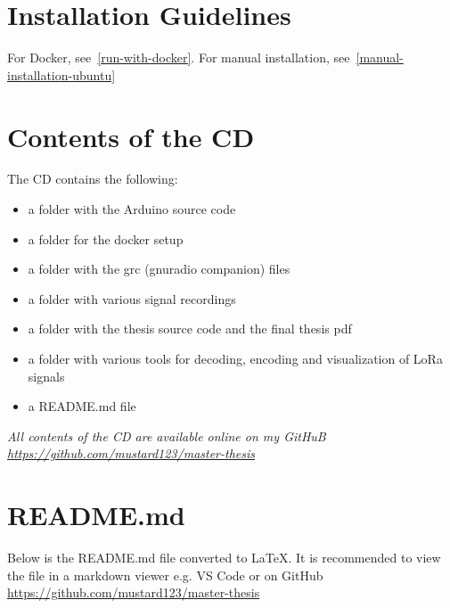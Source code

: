 \appendix

\chapter{Installation Guidelines}
For Docker, see~\ref{run-with-docker}.
For manual installation, see~\ref{manual-installation-ubuntu}

\chapter{Contents of the CD}
The CD contains the following:

\begin{itemize}
    \item a folder with the Arduino source code
    \item a folder for the docker setup
    \item a folder with the grc (gnuradio companion) files
    \item a folder with various signal recordings
    \item a folder with the thesis source code and the final thesis pdf
    \item a folder with various tools for decoding, encoding and visualization of LoRa signals
    \item a README.md file
\end{itemize}

\emph{All contents of the CD are available online on my GitHuB \url{https://github.com/mustard123/master-thesis}}


\chapter{README.md}
Below is the README.md file converted to \LaTeX. It is
recommended to view the file in a markdown viewer e.g. VS Code or on GitHub \url{https://github.com/mustard123/master-thesis}



